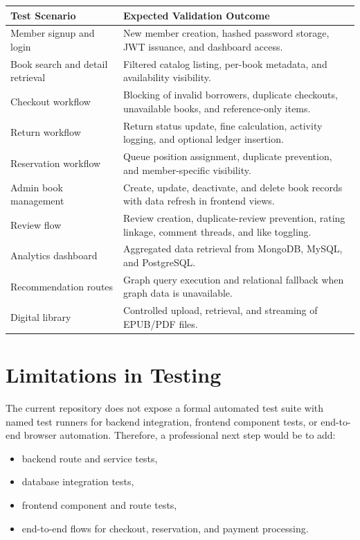 \documentclass[12pt,a4paper]{report}
\begin{document}
\begin{longtable}{p{} p{}}
\toprule
\textbf{Test Scenario} & \textbf{Expected Validation Outcome} \\
\midrule
\endhead
Member signup and login & New member creation, hashed password storage, JWT issuance, and dashboard access. \\
Book search and detail retrieval & Filtered catalog listing, per-book metadata, and availability visibility. \\
Checkout workflow & Blocking of invalid borrowers, duplicate checkouts, unavailable books, and reference-only items. \\
Return workflow & Return status update, fine calculation, activity logging, and optional ledger insertion. \\
Reservation workflow & Queue position assignment, duplicate prevention, and member-specific visibility. \\
Admin book management & Create, update, deactivate, and delete book records with data refresh in frontend views. \\
Review flow & Review creation, duplicate-review prevention, rating linkage, comment threads, and like toggling. \\
Analytics dashboard & Aggregated data retrieval from MongoDB, MySQL, and PostgreSQL. \\
Recommendation routes & Graph query execution and relational fallback when graph data is unavailable. \\
Digital library & Controlled upload, retrieval, and streaming of EPUB/PDF files. \\
\bottomrule
\end{longtable}

\section{Limitations in Testing}
The current repository does not expose a formal automated test suite with named test runners for backend integration, frontend component tests, or end-to-end browser automation. Therefore, a professional next step would be to add:
\begin{itemize}[leftmargin=1.5em]
    \item backend route and service tests,
    \item database integration tests,
    \item frontend component and route tests,
    \item end-to-end flows for checkout, reservation, and payment processing.
\end{itemize}
\end{document}
